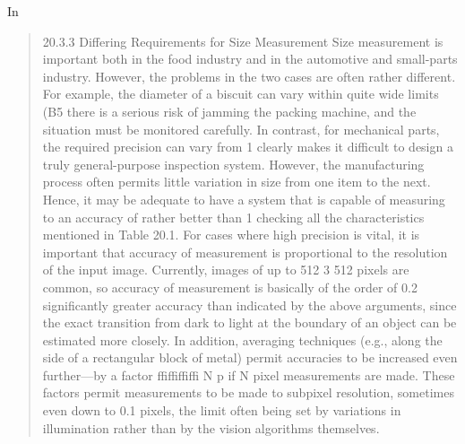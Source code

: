 \documentclass[a4paper,12pt]{article}
\begin{document}
In \cite{Davies:2012:CMV:2341317}
\begin{quotation}
20.3.3 Differing Requirements for Size Measurement
Size measurement is important both in the food industry and in the automotive
and small-parts industry. However, the problems in the two cases are often rather
different. For example, the diameter of a biscuit can vary within quite wide limits
(B5%
there is a serious risk of jamming the packing machine, and the situation must be
monitored carefully. In contrast, for mechanical parts, the required precision can
vary from 1%
clearly makes it difficult to design a truly general-purpose inspection system.
However, the manufacturing process often permits little variation in size from one
item to the next. Hence, it may be adequate to have a system that is capable of
measuring to an accuracy of rather better than 1%
checking all the characteristics mentioned in Table 20.1.
For cases where high precision is vital, it is important that accuracy of measurement
is proportional to the resolution of the input image. Currently, images of
up to 512 3 512 pixels are common, so accuracy of measurement is basically of
the order of 0.2%
significantly greater accuracy than indicated by the above arguments, since the
exact transition from dark to light at the boundary of an object can be estimated
more closely. In addition, averaging techniques (e.g., along the side of a rectangular
block of metal) permit accuracies to be increased even further—by a factor ffiffiffiffi
N p if
N pixel measurements are made. These factors permit measurements to be made to
subpixel resolution, sometimes even down to 0.1 pixels, the limit often being set by
variations in illumination rather than by the vision algorithms themselves.
\end{quotation}

\printbibliography
\end{document}
